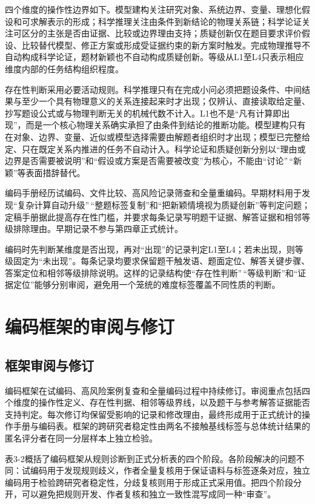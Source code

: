 \documentclass[
  12pt,
  a4paper,twoside,openany]{ctexbook}
\begin{document}
四个维度的操作性边界如下。模型建构关注研究对象、系统边界、变量、理想化假设和可求解表示的形成；科学推理关注由条件到新结论的物理关系链；科学论证关注可区分的主张是否由证据、比较或边界理由支持；质疑创新仅在题目要求评价假设、比较替代模型、修正方案或形成受证据约束的新方案时触发。完成物理推导不自动构成科学论证，题材新颖也不自动构成质疑创新。等级从L1至L4只表示相应维度内部的任务结构组织程度。

存在性判断采用必要活动规则。科学推理只有在完成小问必须把题设条件、中间结果与至少一个具有物理意义的关系连接起来时才出现；仅辨认、直接读取给定量、抄写题设公式或与物理判断无关的机械代数不计入。L1也不是``凡有计算即出现''，而是一个核心物理关系确实承担了由条件到结论的推断功能。模型建构只有在对象、边界、变量、近似或模型选择需要由解题者组织时才出现；模型已完整给定、只在既定关系内推进的任务不自动计入。科学论证和质疑创新分别以``理由或边界是否需要被说明''和``假设或方案是否需要被改变''为核心，不能由``讨论''\,``新颖''等表面措辞替代。

编码手册经历试编码、文件比较、高风险记录筛查和全量重编码。早期材料用于发现``复杂计算自动升级''\,``整题标签复制''和``把新颖情境视为质疑创新''等判定问题；定稿手册据此提高存在性门槛，并要求每条记录写明题干证据、解答证据和相邻等级排除理由。早期记录不参与第四章正式统计。

编码时先判断某维度是否出现，再对``出现''的记录判定L1至L4；若未出现，则等级固定为``未出现''。每条记录均要求保留题干触发语、题面定位、解答关键步骤、答案定位和相邻等级排除说明。这样的记录结构使``存在性判断''\,``等级判断''和``证据定位''能够分别审阅，避免用一个笼统的难度标签覆盖不同性质的判断。

\section{编码框架的审阅与修订}\label{ux7f16ux7801ux6846ux67b6ux7684ux5ba1ux9605ux4e0eux4feeux8ba2}

\subsection{框架审阅与修订}\label{ux6846ux67b6ux5ba1ux9605ux4e0eux4feeux8ba2}

编码框架在试编码、高风险案例复查和全量编码过程中持续修订。审阅重点包括四个维度的操作性定义、存在性判据、相邻等级界线，以及题干与参考解答证据能否支持判定。每次修订均保留受影响的记录和修改理由，最终形成用于正式统计的操作手册与编码表。框架的跨研究者稳定性由两名不接触基线标签与总体统计结果的匿名评分者在同一分层样本上独立检验。

表3-2概括了编码框架从规则诊断到正式分析表的四个阶段。各阶段解决的问题不同：试编码用于发现规则歧义，作者全量复核用于保证语料与标签逐条对应，独立编码用于检验跨研究者稳定性，分歧复核则用于形成正式采用值。把四个阶段分开，可以避免把规则开发、作者复核和独立一致性混写成同一种``审查''。
\end{document}
